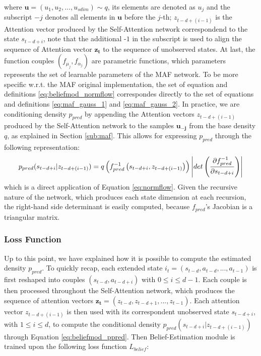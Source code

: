             where $\mathbf{u} = (u_1, u_2, ..., u_{sdim}) \sim q$, its elements are denoted as $u_j$ and the subscript $-j$ denotes all elements in $\mathbf{u}$ before the $j$-th; $z_{t-d+(i-1)}$ is the Attention vector produced by the Self-Attention network correspondend to the state $s_{t-d+i}$, note that the additional -$1$ in the subscript is used to align the sequence of Attention vector $\mathbf{z_t}$ to the sequence of unobserved states. At last, the function couples $(f_{\mu_j}, f_{\alpha_j})$ are parametric functions, which parameters represents the set of learnable parameters of the MAF network. To be more specific w.r.t. the MAF original implementation, the set of equation and definitions \ref{eq:beliefmod_normflow} correspondes directly to the set of equations and definitions \ref{eq:maf_gauss_1} and \ref{eq:maf_gauss_2}. \newline
            In practice, we are conditioning density $p_{pred}$ by appending the Attention vectors $z_{t-d+(i-1)}$ produced by the Self-Attention network to the samples $\mathbf{u_{-j}}$ from the base density $q$, as explained in Section \ref{sub:maf}. This allows for expressing $p_{pred}$ through the following representation:
            \begin{align}
                \label{eq:beliefmod_ppred}
                p_{pred} (s_{t-d+i} \vert z_{t-d+(i-1)}) = q \left( f_{pred}^{-1} \left(s_{t-d+i}, z_{t-d+(i-1)} \right) \right) \abs*{det \left( \frac{\partial f_{pred}^{-1}}{\partial s_{t-d+i}} \right)}
            \end{align}
            which is a direct application of Equation \ref{eq:normflow}. Given the recursive nature of the network, which produces each state dimension at each recursion, the right-hand side determinant is easily computed, because $f_{pred}$'s Jacobian is a triangular matrix.
            
            \subsubsection{Loss Function}
            Up to this point, we have explained how it is possible to compute the estimated density $p_{pred}$. To quickly recap, each extended state $i_t = (s_{t-d}, a_{t-d}, ..., a_{t-1})$ is first reshaped into couples $(s_{t-d}, a_{t-d+i})$ with $0 \leq i \leq d-1$. Each couple is then processed throughout the Self-Attention network, which produces the sequence of attention vectors $\mathbf{z_t} = (z_{t-d}, z_{t-d+1}, ..., z_{t-1})$. Each attention vector $z_{t-d+(i-1)}$ is then used with its correspondent unobserved state $s_{t-d+i}$, with $1 \leq i \leq d$, to compute the conditional density $p_{pred} (s_{t-d+i} \vert z_{t-d+(i-1)})$ through Equation \ref{eq:beliefmod_ppred}. \newline
            Then Belief-Estimation module is trained upon the following loss function $L_{belief}$: 
            
